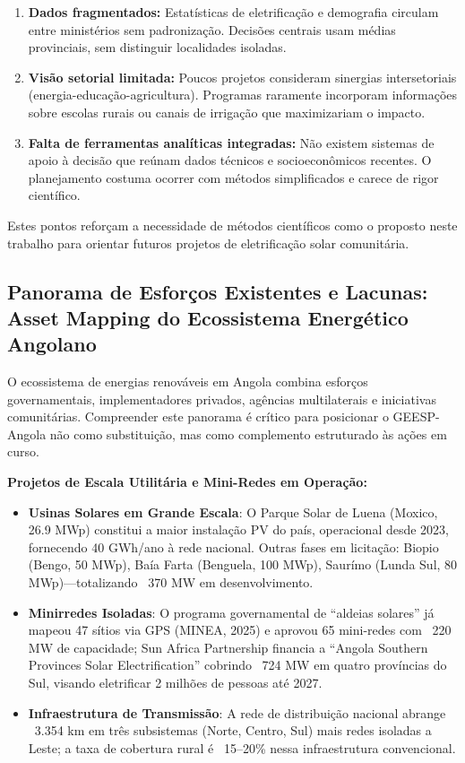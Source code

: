 \documentclass[12pt, a4paper]{article}
\begin{document}
\begin{enumerate}
\item \textbf{Dados fragmentados:} Estatísticas de eletrificação e demografia circulam entre ministérios sem padronização. Decisões centrais usam médias provinciais, sem distinguir localidades isoladas.
\item \textbf{Visão setorial limitada:} Poucos projetos consideram sinergias intersetoriais (energia-educação-agricultura). Programas raramente incorporam informações sobre escolas rurais ou canais de irrigação que maximizariam o impacto.
\item \textbf{Falta de ferramentas analíticas integradas:} Não existem sistemas de apoio à decisão que reúnam dados técnicos e socioeconômicos recentes. O planejamento costuma ocorrer com métodos simplificados e carece de rigor científico.
\end{enumerate}

Estes pontos reforçam a necessidade de métodos científicos como o proposto neste trabalho para orientar futuros projetos de eletrificação solar comunitária.

\subsection{Panorama de Esforços Existentes e Lacunas: Asset Mapping do Ecossistema Energético Angolano}

O ecossistema de energias renováveis em Angola combina esforços governamentais, implementadores privados, agências multilaterais e iniciativas comunitárias. Compreender este panorama é crítico para posicionar o GEESP-Angola não como substituição, mas como complemento estruturado às ações em curso.

\textbf{Projetos de Escala Utilitária e Mini-Redes em Operação:}
\begin{itemize}
\item \textbf{Usinas Solares em Grande Escala}: O Parque Solar de Luena (Moxico, 26.9 MWp) constitui a maior instalação PV do país, operacional desde 2023, fornecendo 40 GWh/ano à rede nacional. Outras fases em licitação: Biopio (Bengo, 50 MWp), Baía Farta (Benguela, 100 MWp), Saurímo (Lunda Sul, 80 MWp)—totalizando ~370 MW em desenvolvimento.
\item \textbf{Minirredes Isoladas}: O programa governamental de ``aldeias solares'' já mapeou 47 sítios via GPS (MINEA, 2025) e aprovou 65 mini-redes com ~220 MW de capacidade; Sun Africa Partnership financia a ``Angola Southern Provinces Solar Electrification'' cobrindo ~724 MW em quatro províncias do Sul, visando eletrificar 2 milhões de pessoas até 2027.
\item \textbf{Infraestrutura de Transmissão}: A rede de distribuição nacional abrange ~3.354 km em três subsistemas (Norte, Centro, Sul) mais redes isoladas a Leste; a taxa de cobertura rural é ~15--20\% nessa infraestrutura convencional.
\end{itemize}
\end{document}
